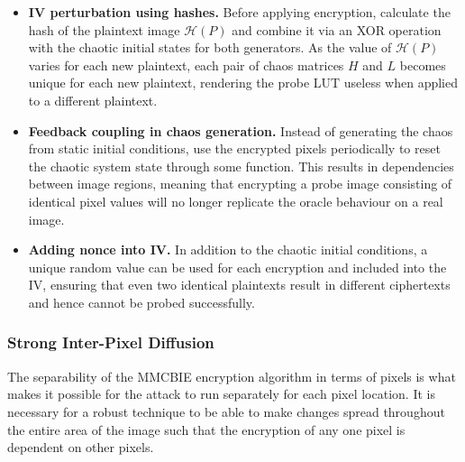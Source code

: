 \begin{itemize}
    \item \textbf{IV perturbation using hashes.} Before applying encryption,
    calculate the hash of the plaintext image $\mathcal{H}(P)$ and combine
    it via an XOR operation with the chaotic initial states for both
    generators. As the value of $\mathcal{H}(P)$ varies for each new
    plaintext, each pair of chaos matrices $H$ and $L$ becomes unique for
    each new plaintext, rendering the probe LUT useless when applied to a
    different plaintext.

    \item \textbf{Feedback coupling in chaos generation.} Instead of
    generating the chaos from static initial conditions, use the encrypted
    pixels periodically to reset the chaotic system state through some
    function. This results in dependencies between image regions,
    meaning that encrypting a probe image consisting of identical pixel
    values will no longer replicate the oracle behaviour on a real
    image.

    \item \textbf{Adding nonce into IV.} In addition to the chaotic
    initial conditions, a unique random value can be used for each
    encryption and included into the IV, ensuring that even two
    identical plaintexts result in different ciphertexts and hence cannot
    be probed successfully.
\end{itemize}

\subsubsection{Strong Inter-Pixel Diffusion}

The separability of the MMCBIE encryption algorithm in terms of pixels is what makes it possible for the attack to run separately for each pixel location. It is necessary for a robust technique to be able to make changes spread throughout the entire area of the image such that the encryption of any one pixel is dependent on other pixels.

